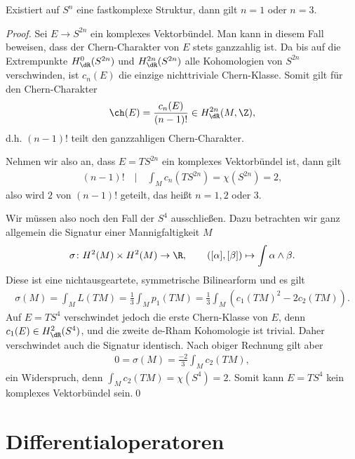 \documentclass[%
	paper=a5,%
	fleqn,%
	DIV=18,%
	BCOR=0mm,
	fontsize=11pt,
	titlepage=false,%
	bibliography=totoc,
	DIV=18,%
	twoside=true,
	pdftitle=Riemannsche Geometrie,
	pdfauthor=Uwe Semmelmann,
	numbers=noendperiod]%
	{scrbook}
\begin{document}
\begin{prop}
Existiert auf $S^n$ eine fastkomplexe Struktur, dann gilt $n=1$ oder $n=3$.\fish
\end{prop}
\begin{proof}
Sei $E\to S^{2n}$ ein komplexes Vektorbündel. Man kann in diesem Fall beweisen, dass der Chern-Charakter von $E$ stets ganzzahlig ist. Da bis auf die Extrempunkte $H_{\dR}^0(S^{2n})$ und $H_{\dR}^{2n}(S^{2n})$ alle Kohomologien von $S^{2n}$ verschwinden, ist $c_{n}(E)$ die einzige nichttriviale Chern-Klasse. Somit gilt für den Chern-Charakter
\begin{align*}
\ch(E) = \frac{c_{n}(E)}{(n-1)!}\in H^{2n}_{\dR}(M,\Z),
\end{align*}
d.h. $(n-1)!$ teilt den ganzzahligen Chern-Charakter.

Nehmen wir also an, dass $E=TS^{2n}$ ein komplexes Vektorbündel ist, dann gilt
\begin{align*}
(n-1)! \quad \bigg|\quad \int_{M} c_n(TS^{2n}) = \chi(S^{2n}) = 2,
\end{align*}
also wird $2$ von $(n-1)!$  geteilt, das heißt $n=1,2$ oder $3$.

Wir müssen also noch den Fall der $S^4$ ausschließen. Dazu betrachten wir ganz allgemein
die Signatur einer Mannigfaltigkeit $M$
\begin{align*}
\sigma\colon H^2(M)\times H^2(M)\to \R,\qquad ([\alpha],[\beta]) \mapsto \int \alpha\wedge \beta.
\end{align*}
Diese ist eine nichtausgeartete, symmetrische Bilinearform und es gilt
\begin{align*}
\sigma(M) = \int_{M} L(TM) = \frac{1}{3}\int_{M} p_{1}(TM) = 
\frac{1}{3}\int_{M} (c_{1}(TM)^2 - 2c_{2}(TM)). 
\end{align*}
Auf $E=TS^4$ verschwindet jedoch die erste Chern-Klasse von $E$, denn $c_{1}(E) \in H_{\dR}^2(S^4)$, und die zweite de-Rham Kohomologie ist trivial. Daher verschwindet auch die Signatur identisch. Nach obiger Rechnung gilt aber
\begin{align*}
0 = \sigma(M) =  \frac{-2}{3}\int_{M} c_{2}(TM),
\end{align*}
ein Widerspruch, denn $\int_Mc_{2}(TM)= \chi(S^4)=2$. Somit kann $E = TS^4$ kein komplexes Vektorbündel sein.\qed
\end{proof}


\chapter{Differentialoperatoren}
\end{document}
